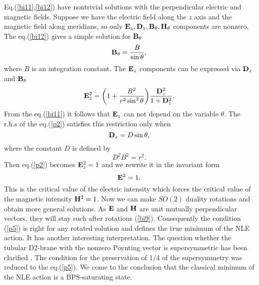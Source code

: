 \documentclass[a4paper,12pt]{article}
\begin{document}
Eq.(\ref{bi11},\ref{bi12}) have nontrivial solutions with the perpendicular 
electric and magnetic fields. Suppose we have the electric field along the $z$ 
axis and the magnetic field along meridians, so only 
${{\bf E}}_z,{{\bf D}}_z,{{\bf B}}_{\theta},{{\bf H}}_{\theta}$ components are nonzero.  
The eq.(\ref{bi12}) gives a simple solution for ${{\bf B}}_{\theta}$
\begin{equation} 
{{\bf B}}_{\theta}=\frac{B}{\sin\theta},
\label{p1}
\end{equation}
where $B$ is an integration constant. The ${{\bf E}}_z$ components can be 
expressed via ${{\bf D}}_z$ and ${{\bf B}}_{\theta}$
\begin{equation} 
{\bf E}^2_z=\bigg(1+\frac{B^2}{r^2\sin^2\theta}\bigg)
\frac{{\bf D}^2_z}{1+{\bf D}^2_z}.
\label{p2}
\end{equation}
From the eq.(\ref{bi11}) it follows that ${{\bf E}}_z$ can not depend on the
variable $\theta$. The r.h.s of the eq.(\ref{p2}) satisfies this 
restriction only when
\begin{equation} 
{{\bf D}}_z=D\sin\theta,
\label{p3}
\end{equation}
where the constant $D$ is defined by
\begin{equation} 
D^2B^2=r^2.
\label{p4}
\end{equation}
Then eq.(\ref{p2}) becomes ${\bf E}_z^2=1$ and we rewrite it in the invariant 
form
\begin{equation}
{{\bf E}}^2=1.
\label{p5}
\end{equation}
This is the critical value of the electric intensity which forces the critical 
value of the magnetic intensity ${{\bf H}}^2=1$. Now we can make $SO(2)$ duality 
rotations and obtain more general solutions. As ${\bf E}$ and ${\bf H}$ are unit mutually perpendicular vectors, they will stay such after rotations (\ref{bi9}).
Consequently the condition (\ref{p5}) is right for any rotated solution and 
defines the true minimum of the NLE action. It has another interesting 
interpretation. The question whether the tubular D2-brane with the nonzero 
Poynting vector is supersymmetric has been clarified \cite{1}. 
The condition for the preservation of 1/4 of the supersymmetry was reduced to
the eq.(\ref{p5}). We come to the conclusion that the classical minimum 
of the NLE action is a BPS-saturating state.

\noindent 
\end{document}
